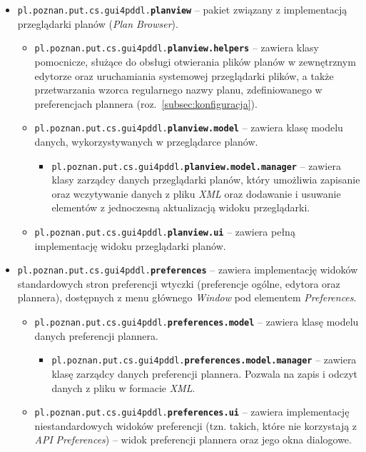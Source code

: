 \begin{itemize}
\item \texttt{pl.poznan.put.cs.gui4pddl.\textbf{planview}} -- pakiet związany z implementacją przeglądarki planów (\textit{Plan Browser}).
\begin{itemize}
\item \texttt{pl.poznan.put.cs.gui4pddl.\textbf{planview.helpers}} -- zawiera klasy pomocnicze, służące do obsługi otwierania plików planów w zewnętrznym edytorze oraz uruchamiania systemowej przeglądarki plików, a także przetwarzania wzorca regularnego nazwy planu, zdefiniowanego w preferencjach plannera (roz.~\ref{subsec:konfiguracja}).
\item \texttt{pl.poznan.put.cs.gui4pddl.\textbf{planview.model}} -- zawiera klasę modelu danych, wykorzystywanych w przeglądarce planów.
\begin{itemize}
\item \texttt{pl.poznan.put.cs.gui4pddl.\textbf{planview.model.manager}} -- zawiera klasy zarządcy danych przeglądarki planów, który umożliwia zapisanie oraz wczytywanie danych z pliku \textit{XML} oraz dodawanie i usuwanie elementów z jednoczesną aktualizacją widoku przeglądarki.
\end{itemize}
\item \texttt{pl.poznan.put.cs.gui4pddl.\textbf{planview.ui}} -- zawiera pełną implementację widoku przeglądarki planów.
\end{itemize}
\item \texttt{pl.poznan.put.cs.gui4pddl.\textbf{preferences}} -- zawiera implementację widoków standardowych stron preferencji wtyczki (preferencje ogólne, edytora oraz plannera), dostępnych z menu głównego \textit{Window} pod elementem \textit{Preferences}.
\begin{itemize}
\item \texttt{pl.poznan.put.cs.gui4pddl.\textbf{preferences.model}} -- zawiera klasę modelu danych preferencji plannera.
\begin{itemize}
\item \texttt{pl.poznan.put.cs.gui4pddl.\textbf{preferences.model.manager}} -- zawiera klasę zarządcy danych preferencji plannera. Pozwala na zapis i odczyt danych z pliku w formacie \textit{XML}.
\end{itemize}
\item \texttt{pl.poznan.put.cs.gui4pddl.\textbf{preferences.ui}} -- zawiera implementację niestandardowych widoków preferencji (tzn. takich, które nie korzystają z \textit{API} \textit{Preferences}) -- widok preferencji plannera oraz jego okna dialogowe.
\end{itemize}

\end{itemize}
